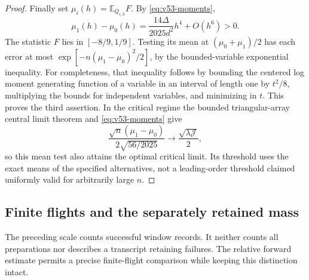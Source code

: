 \begin{proof}
Finally set $\mu_i(h)=\mathbb E_{Q_{i,h}}F$.  By
\eqref{eq:v53-moments},
\[
 \mu_1(h)-\mu_0(h)=\frac{14\Delta}{2025d^2}h^4+O(h^6)>0.
\]
The statistic $F$ lies in $[-8/9,1/9]$.  Testing its mean at
$(\mu_0+\mu_1)/2$ has each error at most
$\exp[-n(\mu_1-\mu_0)^2/2]$, by the bounded-variable exponential
inequality.  For completeness, that inequality follows by bounding the
centered log moment generating function of a variable in an interval of
length one by $t^2/8$, multiplying the bounds for independent variables,
and minimizing in $t$.  This proves the third assertion.  In the critical
regime the bounded triangular-array central limit theorem and
\eqref{eq:v53-moments} give
\[
 \frac{\sqrt n(\mu_1-\mu_0)}{2\sqrt{56/2025}}
       \longrightarrow\frac{\sqrt{\lambda\mathcal J}}2,
\]
so this mean test also attains the optimal critical limit.  Its threshold
uses the exact means of the specified alternatives, not a leading-order
threshold claimed uniformly valid for arbitrarily large $n$.
\end{proof}

\subsection{Finite flights and the separately retained mass}

The preceding scale counts successful window records.  It neither counts
all preparations nor describes a transcript retaining failures.  The
relative forward estimate permits a precise finite-flight comparison while
keeping this distinction intact.

